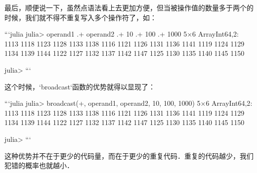 最后，顺便说一下，虽然点语法看上去更加方便，但当被操作值的数量多于两个的时候，我们就不得不重复写入多个操作符了，如：

```julia
julia> operand1 .+ operand2 .+ 10 .+ 100 .+ 1000
5×6 Array{Int64,2}:
 1113  1118  1123  1128  1133  1138
 1116  1121  1126  1131  1136  1141
 1119  1124  1129  1134  1139  1144
 1122  1127  1132  1137  1142  1147
 1125  1130  1135  1140  1145  1150

julia> 
```

这个时候，`broadcast`函数的优势就得以显现了：

```julia
julia> broadcast(+, operand1, operand2, 10, 100, 1000)
5×6 Array{Int64,2}:
 1113  1118  1123  1128  1133  1138
 1116  1121  1126  1131  1136  1141
 1119  1124  1129  1134  1139  1144
 1122  1127  1132  1137  1142  1147
 1125  1130  1135  1140  1145  1150

julia> 
```

这种优势并不在于更少的代码量，而在于更少的重复代码．重复的代码越少，我们犯错的概率也就越小．